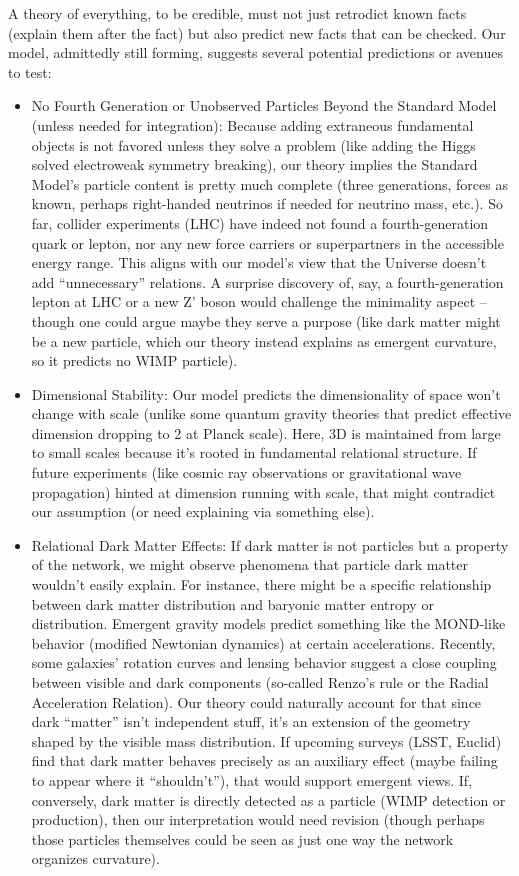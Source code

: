 \documentclass{article}
\begin{document}
A theory of everything, to be credible, must not just retrodict known facts (explain them after the fact) but also predict new facts that can be checked. Our model, admittedly still forming, suggests several potential predictions or avenues to test:

\begin{itemize}
\item No Fourth Generation or Unobserved Particles Beyond the Standard Model (unless needed for integration): Because adding extraneous fundamental objects is not favored unless they solve a problem (like adding the Higgs solved electroweak symmetry breaking), our theory implies the Standard Model’s particle content is pretty much complete (three generations, forces as known, perhaps right-handed neutrinos if needed for neutrino mass, etc.). So far, collider experiments (LHC) have indeed not found a fourth-generation quark or lepton, nor any new force carriers or superpartners in the accessible energy range. This aligns with our model’s view that the Universe doesn’t add “unnecessary” relations. A surprise discovery of, say, a fourth-generation lepton at LHC or a new Z' boson would challenge the minimality aspect – though one could argue maybe they serve a purpose (like dark matter might be a new particle, which our theory instead explains as emergent curvature, so it predicts no WIMP particle).
\item Dimensional Stability: Our model predicts the dimensionality of space won’t change with scale (unlike some quantum gravity theories that predict effective dimension dropping to 2 at Planck scale). Here, 3D is maintained from large to small scales because it’s rooted in fundamental relational structure. If future experiments (like cosmic ray observations or gravitational wave propagation) hinted at dimension running with scale, that might contradict our assumption (or need explaining via something else).
\item Relational Dark Matter Effects: If dark matter is not particles but a property of the network, we might observe phenomena that particle dark matter wouldn’t easily explain. For instance, there might be a specific relationship between dark matter distribution and baryonic matter entropy or distribution. Emergent gravity models predict something like the MOND-like behavior (modified Newtonian dynamics) at certain accelerations\cite{verlinde2016}. Recently, some galaxies’ rotation curves and lensing behavior suggest a close coupling between visible and dark components (so-called Renzo’s rule or the Radial Acceleration Relation)\cite{mcgaugh2016}. Our theory could naturally account for that since dark “matter” isn’t independent stuff, it’s an extension of the geometry shaped by the visible mass distribution\cite{verlinde2016}. If upcoming surveys (LSST, Euclid) find that dark matter behaves precisely as an auxiliary effect (maybe failing to appear where it “shouldn’t”), that would support emergent views. If, conversely, dark matter is directly detected as a particle (WIMP detection or production), then our interpretation would need revision (though perhaps those particles themselves could be seen as just one way the network organizes curvature).

\end{itemize}
\end{document}
